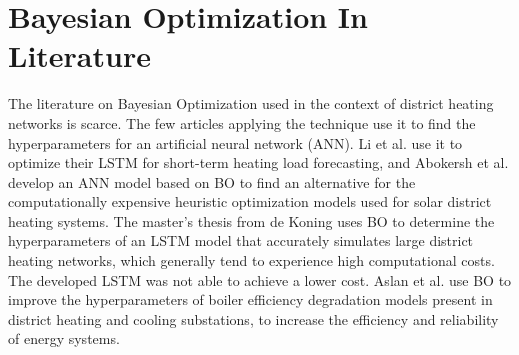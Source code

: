 \section{Bayesian Optimization In Literature}
The literature on Bayesian Optimization used in the context of district heating networks is scarce. The few articles applying the technique use it to find the hyperparameters for an artificial neural network (ANN). Li et al. \cite{LIbayesian} use it to optimize their LSTM for short-term heating load forecasting, and Abokersh et al. \cite{ABOKERSH2020403} develop an ANN model based on BO to find an alternative for the computationally expensive heuristic optimization models used for solar district heating systems. The master's thesis from de Koning \cite{deKoning2020} uses BO to determine the hyperparameters of an LSTM model that accurately simulates large district heating networks, which generally tend to experience high computational costs. The developed LSTM was not able to achieve a lower cost. Aslan et al. \cite{Aslan06062025} use BO to improve the hyperparameters of boiler efficiency degradation models present in district heating and cooling substations, to increase the efficiency and reliability of energy systems.

